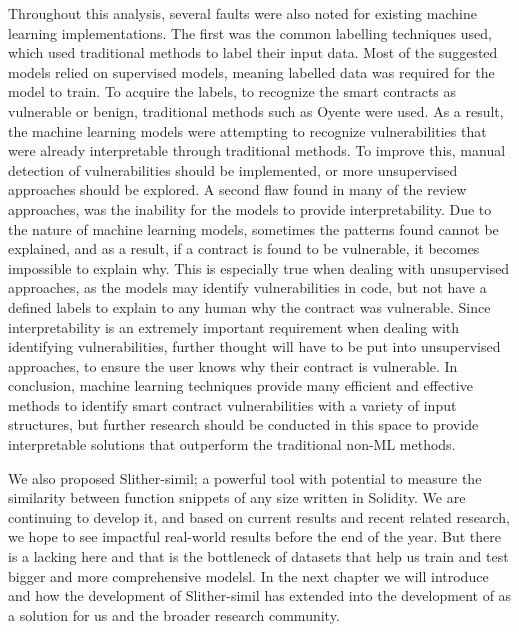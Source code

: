 Throughout this analysis, several faults were also noted for existing machine learning implementations.
The first was the common labelling techniques used, which used traditional methods to label their input data.
Most of the suggested models relied on supervised models, meaning labelled data was required for the model to train.
To acquire the labels, to recognize the smart contracts as vulnerable or benign, traditional methods such as Oyente were used.
As a result, the machine learning models were attempting to recognize vulnerabilities that were already interpretable through traditional methods.
To improve this, manual detection of vulnerabilities should be implemented, or more unsupervised approaches should be explored.
A second flaw found in many of the review approaches, was the inability for the models to provide interpretability.
Due to the nature of machine learning models, sometimes the patterns found cannot be explained, and as a result, if a contract is found to be vulnerable, it becomes impossible to explain why.
This is especially true when dealing with unsupervised approaches, as the models may identify vulnerabilities in code, but not have a defined labels to explain to any human why the contract was vulnerable.
Since interpretability is an extremely important requirement when dealing with identifying vulnerabilities, further thought will have to be put into unsupervised approaches, to ensure the user knows why their contract is vulnerable.
In conclusion, machine learning techniques provide many efficient and effective methods to identify smart contract vulnerabilities with a variety of input structures, but further research should be conducted in this space to provide interpretable solutions that outperform the traditional non-ML methods.

We also proposed Slither-simil; a powerful tool with potential to measure the similarity between function snippets of any size written in Solidity.
We are continuing to develop it, and based on current results and recent related research, we hope to see impactful real-world results before the end of the year.
But there is a lacking here and that is the bottleneck of datasets that help us train and test bigger and more comprehensive modelsl.
In the next chapter we will introduce \etherbase and how the development of Slither-simil has extended into the development of \etherbase as a solution for us and the broader research community.